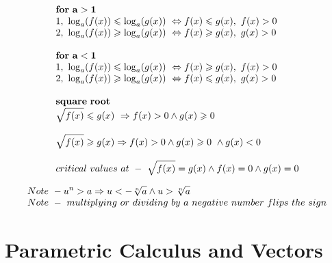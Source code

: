 \documentclass{article}
\begin{document}
\[\begin{array}{>{\displaystyle}l}
    \mathbf{for\ a >1}\\
    1,\ \log_{a}( f( x)) \leqslant \log_{a}( g( x)) \ \Leftrightarrow f( x) \leqslant g( x) ,\ f( x)  >0\\
    2,\ \log_{a}( f( x)) \geqslant \log_{a}( g( x)) \ \Leftrightarrow f( x) \geqslant g( x) ,\ g( x)  >0\\
    \\
    \mathbf{for\ a< 1}\\
    1,\ \log_{a}( f( x)) \leqslant \log_{a}( g( x)) \ \Leftrightarrow f( x) \geqslant g( x) ,\ f( x)  >0\\
    2,\ \log_{a}( f( x)) \geqslant \log_{a}( g( x)) \ \Leftrightarrow f( x) \leqslant g( x) ,\ g( x)  >0\\
    \\
    \mathbf{square\ root}\\
    \sqrt{f( x)} \leqslant g( x) \ \Rightarrow f( x)  >0\land g( x) \geqslant 0\\
    \\
    \sqrt{f( x)} \geqslant g( x) \Rightarrow f( x)  >0\land g( x) \geqslant 0\ \land g( x) < 0\\
    \\
    critical\ values\ at\ -\ \sqrt{f( x)} =g( x) \land f( x) =0\land g( x) =0
    \\
\end{array} 
\]
 
\[
\begin{array}{>{\displaystyle}l}
    Note\ - u^{n}  >a\Rightarrow u< -\sqrt[n]{a} \land u >\sqrt[n]{a}\\
    Note\ -\ multiplying\ or\ dividing\ by\ a\ negative\ number\ flips\ the\ sign\\
\end{array}
\]


\newpage

\section{Parametric Calculus and Vectors}
\end{document}
